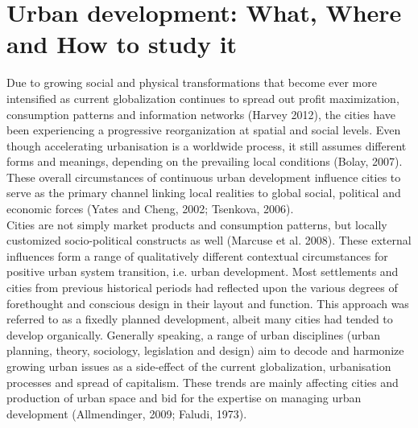 \documentclass[11pt]{report}
\begin{document}
\section{Urban development: What, Where and How to study it}

Due to growing social and physical transformations that become ever more intensified as current globalization continues to spread out profit maximization, consumption patterns and information networks (Harvey 2012), the cities have been experiencing a progressive reorganization at spatial and social levels. Even though accelerating urbanisation is a worldwide process, it still assumes different forms and meanings, depending on the prevailing local conditions (Bolay, 2007). These overall circumstances of continuous urban development influence cities to serve as the primary channel linking local realities to global social, political and economic forces (Yates and Cheng, 2002; Tsenkova, 2006).
\\
Cities are not simply market products and consumption patterns, but locally customized socio-political constructs as well (Marcuse et al. 2008). These external influences form a range of qualitatively different contextual circumstances for positive urban system transition, i.e. urban development. Most settlements and cities from previous historical periods had reflected upon the various degrees of forethought and conscious design in their layout and function. This approach was referred to as a fixedly planned development, albeit many cities had tended to develop organically. Generally speaking, a range of urban disciplines (urban planning, theory, sociology, legislation and design) aim to decode and harmonize growing urban issues as a side-effect of the current globalization, urbanisation processes and spread of capitalism. These trends are mainly affecting cities and production of urban space and bid for the expertise on managing urban development (Allmendinger, 2009; Faludi, 1973). 
\\
\end{document}
